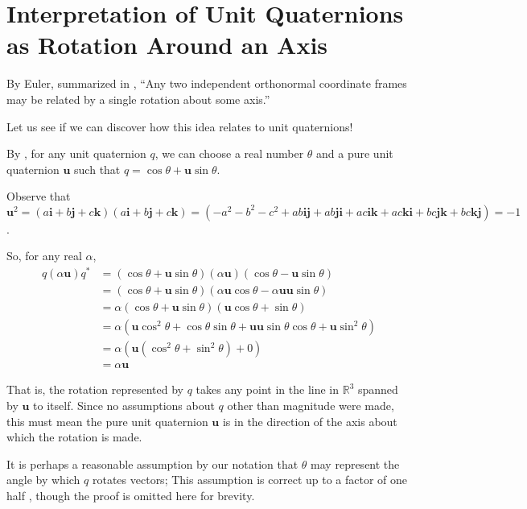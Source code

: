 \documentclass[12pt, letterpaper]{article}
\renewcommand{\i}{\mathbf{i}}
\renewcommand{\j}{\mathbf{j}}
\renewcommand{\k}{\mathbf{k}}
\newcommand{\R}{\mathbb{R}}
\renewcommand{\b}[1]{\mathbf{#1}}
\begin{document}

\section{Interpretation of Unit Quaternions as Rotation Around an Axis}

By Euler, summarized in \cite{kuipers}, ``Any two independent orthonormal coordinate frames may be related by a
single rotation about some axis.''

Let us see if we can discover how this idea relates to unit quaternions!

By \cite{stackex-polar}, for any unit quaternion $q$, we can choose a real number $\theta$ and a pure unit quaternion $\b{u}$ such that $q=\cos \theta + \b{u} \sin \theta$.

Observe that $\b{u}^2=(a\i+b\j+c\k)(a\i+b\j+c\k)=(-a^2-b^2-c^2+ab\i\j+ab\j\i + ac\i\k+ac\k\i+bc\j\k+bc\k\j)=-1$.

So, for any real $\alpha$,
\begin{align*}
    q (\alpha \b{u})q^* &= (\cos \theta + \b{u} \sin \theta)(\alpha \b{u})(\cos \theta - \b{u} \sin \theta) \\
    &= (\cos \theta + \b{u} \sin \theta)(\alpha \b{u} \cos \theta - \alpha \b{u} \b{u} \sin \theta) \\
    &= \alpha (\cos \theta + \b{u} \sin \theta)( \b{u} \cos \theta + \sin \theta) \\
    &= \alpha (\b{u} \cos^2 \theta + \cos\theta \sin \theta + \b{u} \b{u} \sin \theta \cos \theta + \b{u} \sin^2 \theta) \\
    &= \alpha(\b{u}(\cos^2 \theta + \sin^2 \theta) + 0) \\
    &= \alpha \b{u}
\end{align*}

That is, the rotation represented by $q$ takes any point in the line in $\R^3$ spanned by $\b{u}$ to itself. Since no assumptions about $q$ other than magnitude were made, this must mean the pure unit quaternion $\b{u}$ is in the direction of the axis about which the rotation is made.

It is perhaps a reasonable assumption by our notation that $\theta$ may represent the angle by which $q$ rotates vectors; This assumption is correct up to a factor of one half \cite{hanson}, though the proof is omitted here for brevity.
\end{document}
